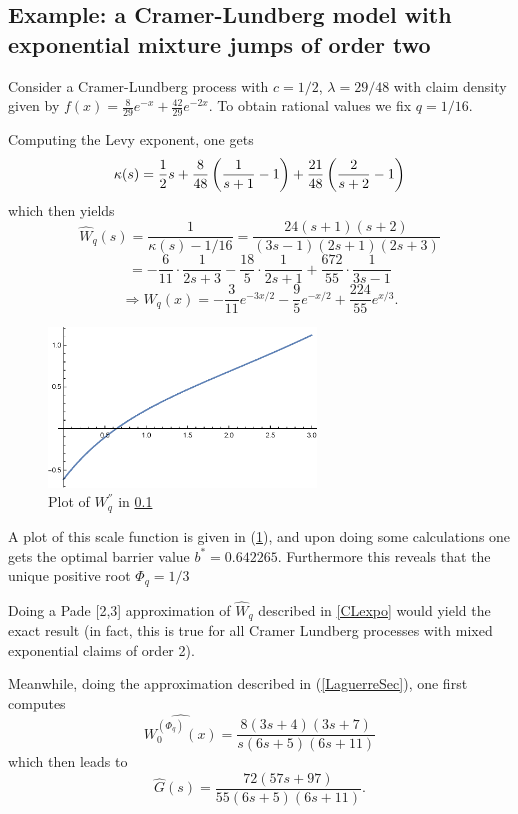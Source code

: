 \subsection{Example: a Cramer-Lundberg model with exponential mixture jumps of order two}
\label{exCL2}

Consider a Cramer-Lundberg process with $c=1/2$, $\lambda = 29/48$ with claim density given by $f(x) = \frac{8}{29}e^{-x} + \frac{42}{29} e^{-2x}$. To obtain rational values we fix $q=1/16$.

Computing the Levy exponent, one gets
\[
\kappa(s) = \frac{1}{2} s + \frac{8}{48} \left( \frac{1}{s+1} - 1\right) + \frac{21}{48} \left( \frac{2}{s+2} -1 \right)
\]
which then yields
\[
\hat{W}_q (s) = \frac{1}{\kappa(s) - 1/16} = \frac{24(s+1)(s+2)}{(3s-1)(2s+1)(2s+3)}
\]
\[
= -\frac{6}{11} \cdot \frac{1}{2s+3} - \frac{18}{5} \cdot \frac{1}{2s+1} +\frac{672}{55} \cdot \frac{1}{3s-1}
\]
\[
\Rightarrow W_q(x) = -\frac{3}{11} e^{-3x/2} - \frac{9}{5} e^{-x/2} +\frac{224}{55} e^{x/3}.
\]

\begin{figure}
\caption{Plot of $W_q^{''}$ in \ref{exCL2}}
\begin{center}
\includegraphics [width=2.8in]{pw2.eps}
\end{center}
\label{pw2}
\end{figure}

A plot of this scale function is given in (\ref{pw2}), and upon doing some calculations one gets the optimal barrier value $b^* = 0.642265$. Furthermore this reveals that the unique positive root $\Phi_q = 1/3$

Doing a Pade [2,3] approximation of $\hat{W}_q$ described in \ref{CLexpo} would yield the exact result (in fact, this is true for all Cramer Lundberg processes with mixed exponential claims of order 2).

Meanwhile, doing the approximation described in (\ref{LaguerreSec}), one first computes
\[
\widehat{W^{(\Phi_q)}_0 (x)} = \frac{8(3s+4)(3s+7)}{s(6s+5)(6s+11)}
\]
which then leads to
\[
\hat{G}(s) = \frac{72(57s+97)}{55(6s+5)(6s+11)}.
\]

